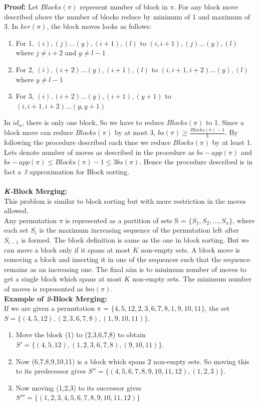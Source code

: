 \documentclass[BTech]{iitmdiss}
\begin{document}
\textbf{Proof:}
Let $Blocks(\pi)$ represent number of block in $\pi$. For any block move described above the number of blocks reduce by minimum of 1 and maximum of 3. In $ker(\pi)$, the block moves looks as follows:
\begin{enumerate}
    \item For 1, $(i),(j)...(y),(i+1),(l)$ to $(i,i+1),(j)...(y),(l)$ where $j \neq i+2$ and $y \neq l-1$
    \item For 2, $(i),(i+2)...(y),(i+1),(l)$ to $(i,i+1,i+2)...(y),(l)$ where $y \neq l-1$
    \item For 3, $(i),(i+2)...(y),(i+1),(y+1)$ to $(i,i+1,i+2)...(y,y+1)$
\end{enumerate}
In $id_n$, there is only one block, So we have to reduce $Blocks(\pi)$ to 1. Since a block move can reduce $Blocks(\pi)$ by at most 3, $bs(\pi) \geq \frac{Blocks(\pi) - 1}{3}$. By following the procedure described each time we reduce $Blocks(\pi)$ by at least 1. Lets denote number of moves as described in the procedure as $bs-app(\pi)$ and $bs-app(\pi) \leq Blocks(\pi)-1 \leq 3bs(\pi)$. Hence the procedure described is in fact a \textit{3} approximation for Block sorting.\\~\\
\noindent
\textbf{\textit{K-}Block Merging:}\\
This problem is similar to block sorting but with more restriction in the moves allowed.\\
Any permutation $\pi$ is represented as a partition of sets S = $\{S_1,S_2,...,S_n\}$, where each set $S_i$ is the maximum increasing sequence of the permutation left after $S_{i-1}$ is formed. The block definition is same as the one in block sorting. But we can move a block only if it spans at most $K$ non-empty sets. A block move is removing a block and inserting it in one of the sequences such that the sequence remains as an increasing one.  The final aim is to minimum number of moves to get a single block which spans at most $K$ non-empty sets. The minimum number of moves is represented as $bm(\pi)$.\\
\textbf{Example of \textit{2}-Block Merging:}\\
If we are given a permutation $\pi$ = $\{4,5,12,2,3,6,7,8,1,9,10,11\}$, the set $S = \{(4,5,12),(2,3,6,7,8),(1,9,10,11)\}.$
\begin{enumerate}
    \item Move the block (1) to (2,3,6,7,8) to obtain $S' = \{(4,5,12),(1,2,3,6,7,8),(9,10,11)\}.$ 
    \item Now (6,7,8,9,10,11) is a block which spans 2 non-empty sets. So moving this to its predecessor gives $S'' = \{(4,5,6,7,8,9,10,11,12),(1,2,3)\}.$ 
    \item Now moving (1,2,3) to its successor gives $S''' = \{(1,2,3,4,5,6,7,8,9,10,11,12)\}$
\end{enumerate}
\end{document}

